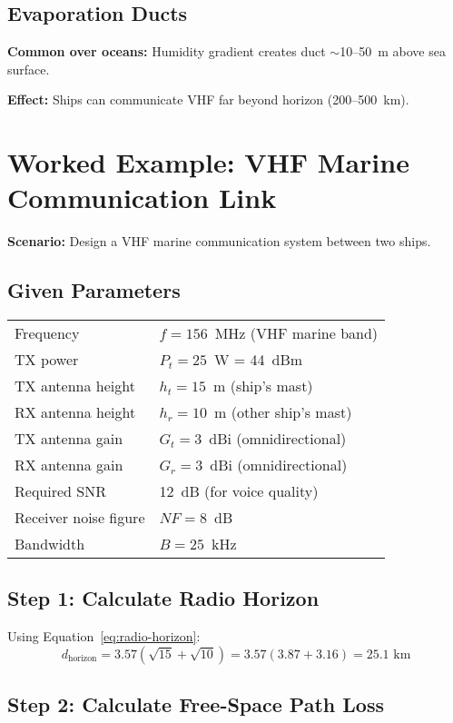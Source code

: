 \subsection{Evaporation Ducts}

\textbf{Common over oceans:} Humidity gradient creates duct $\sim$10--50~m above sea surface.

\textbf{Effect:} Ships can communicate VHF far beyond horizon (200--500~km).

\section{Worked Example: VHF Marine Communication Link}

\textbf{Scenario:} Design a VHF marine communication system between two ships.

\subsection*{Given Parameters}

\begin{tabular}{@{}ll@{}}
Frequency & $f = 156$~MHz (VHF marine band) \\
TX power & $P_t = 25$~W = 44~dBm \\
TX antenna height & $h_t = 15$~m (ship's mast) \\
RX antenna height & $h_r = 10$~m (other ship's mast) \\
TX antenna gain & $G_t = 3$~dBi (omnidirectional) \\
RX antenna gain & $G_r = 3$~dBi (omnidirectional) \\
Required SNR & 12~dB (for voice quality) \\
Receiver noise figure & $NF = 8$~dB \\
Bandwidth & $B = 25$~kHz \\
\end{tabular}

\subsection*{Step 1: Calculate Radio Horizon}

Using Equation~\ref{eq:radio-horizon}:
\begin{equation}
d_{\text{horizon}} = 3.57\left(\sqrt{15} + \sqrt{10}\right) = 3.57(3.87 + 3.16) = 25.1\text{ km}
\end{equation}

\subsection*{Step 2: Calculate Free-Space Path Loss}

